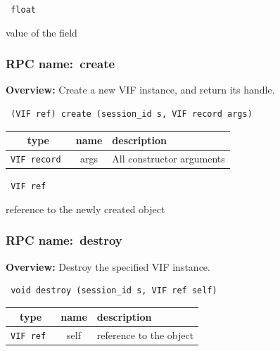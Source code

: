 \vspace{0.3cm}

{\tt 
float
}


value of the field
\vspace{0.3cm}
\vspace{0.3cm}
\vspace{0.3cm}
\subsubsection{RPC name:~create}

{\bf Overview:} 
Create a new VIF instance, and return its handle.

\begin{verbatim} (VIF ref) create (session_id s, VIF record args)\end{verbatim}



 
\vspace{0.3cm}
\begin{tabular}{|c|c|p{7cm}|}
 \hline
{\bf type} & {\bf name} & {\bf description} \\ \hline
{\tt VIF record } & args & All constructor arguments \\ \hline 

\end{tabular}

\vspace{0.3cm}

{\tt 
VIF ref
}


reference to the newly created object
\vspace{0.3cm}
\vspace{0.3cm}
\vspace{0.3cm}
\subsubsection{RPC name:~destroy}

{\bf Overview:} 
Destroy the specified VIF instance.

\begin{verbatim} void destroy (session_id s, VIF ref self)\end{verbatim}



 
\vspace{0.3cm}
\begin{tabular}{|c|c|p{7cm}|}
 \hline
{\bf type} & {\bf name} & {\bf description} \\ \hline
{\tt VIF ref } & self & reference to the object \\ \hline 

\end{tabular}

